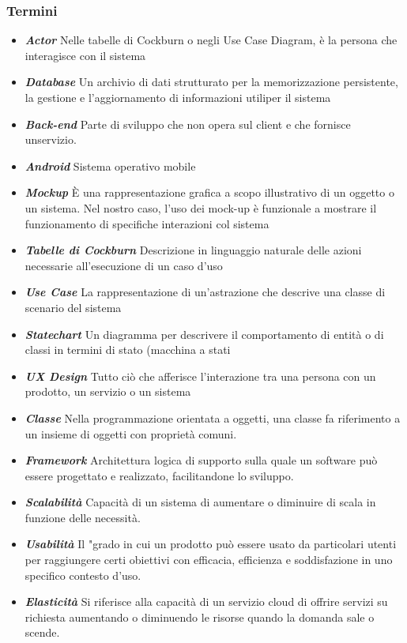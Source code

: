 \documentclass{article}
\begin{document}
			\subsubsection{Termini}
			\begin{itemize}
				\item \textbf{\textit{\textcolor{dark_purple}{Actor}}} Nelle tabelle di Cockburn o negli Use Case Diagram, è la persona che interagisce con il sistema
				\item \textbf{\textit{\textcolor{dark_purple}{Database}}} Un archivio di dati strutturato per la memorizzazione persistente, la gestione e l’aggiornamento di informazioni utiliper il sistema
				\item \textbf{\textit{\textcolor{dark_purple}{Back-end}}} Parte di sviluppo che non opera sul client e che fornisce unservizio.
				\item \textbf{\textit{\textcolor{dark_purple}{Android}}} Sistema operativo mobile
				\item \textbf{\textit{\textcolor{dark_purple}{Mockup}}} È una rappresentazione grafica a scopo illustrativo di un oggetto o un sistema. Nel nostro caso, l’uso dei mock-up è funzionale a mostrare il funzionamento di specifiche interazioni col sistema
				\item \textbf{\textit{\textcolor{dark_purple}{Tabelle di Cockburn}}} Descrizione in linguaggio naturale delle azioni necessarie all’esecuzione di un caso d’uso
				\item \textbf{\textit{\textcolor{dark_purple}{Use Case}}} La rappresentazione di un’astrazione che descrive una classe di scenario del sistema
				\item \textbf{\textit{\textcolor{dark_purple}{Statechart}}} Un diagramma per descrivere il comportamento di entità o di classi in termini di stato (macchina a stati
				\item \textbf{\textit{\textcolor{dark_purple}{UX Design}}} Tutto ciò che afferisce l’interazione tra una persona con un prodotto, un servizio o un sistema
				\item \textbf{\textit{\textcolor{dark_purple}{Classe}}} Nella programmazione orientata a oggetti, una classe fa riferimento a un insieme di oggetti con proprietà comuni.
				\item \textbf{\textit{\textcolor{dark_purple}{Framework}}} Architettura logica di supporto sulla quale un software può essere progettato e realizzato, facilitandone lo sviluppo.
				\item \textbf{\textit{\textcolor{dark_purple}{Scalabilità}}} Capacità di un sistema di aumentare o diminuire di scala in funzione delle necessità.
				\item \textbf{\textit{\textcolor{dark_purple}{Usabilità}}} Il "grado in cui un prodotto può essere usato da particolari utenti per raggiungere certi obiettivi con efficacia, efficienza e soddisfazione in uno specifico contesto d’uso.
				\item \textbf{\textit{\textcolor{dark_purple}{Elasticità}}} Si riferisce alla capacità di un servizio cloud di offrire servizi su richiesta aumentando o diminuendo le risorse quando la domanda sale o scende.
			\end{itemize}
\end{document}
